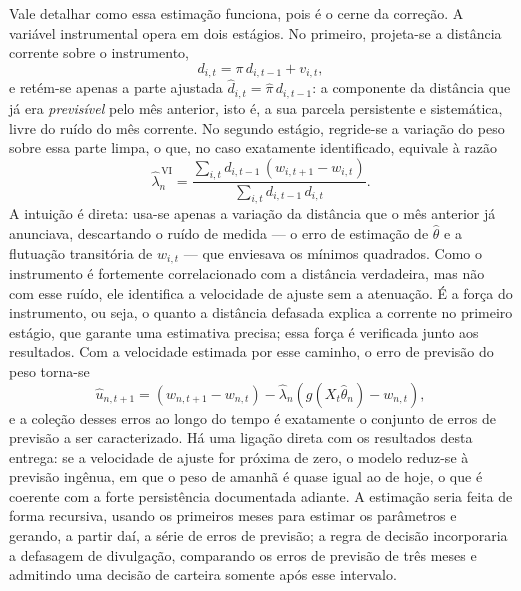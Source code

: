 \documentclass[12pt,a4paper]{article}
\begin{document}
Vale detalhar como essa estimação funciona, pois é o cerne da correção. A variável instrumental
opera em dois estágios. No primeiro, projeta-se a distância corrente sobre o instrumento,
\begin{equation}
d_{i,t} = \pi\,d_{i,t-1} + v_{i,t},
\label{eq:1estagio}
\end{equation}
e retém-se apenas a parte ajustada $\widehat{d}_{i,t}=\widehat{\pi}\,d_{i,t-1}$: a componente da
distância que já era \emph{previsível} pelo mês anterior, isto é, a sua parcela persistente e
sistemática, livre do ruído do mês corrente. No segundo estágio, regride-se a variação do peso
sobre essa parte limpa, o que, no caso exatamente identificado, equivale à razão
\begin{equation}
\widehat{\lambda}^{\,\text{VI}}_n =
\frac{\sum_{i,t} d_{i,t-1}\,(w_{i,t+1}-w_{i,t})}{\sum_{i,t} d_{i,t-1}\,d_{i,t}}.
\label{eq:lambdaiv}
\end{equation}
A intuição é direta: usa-se apenas a variação da distância que o mês anterior já anunciava,
descartando o ruído de medida --- o erro de estimação de $\widehat{\theta}$ e a flutuação
transitória de $w_{i,t}$ --- que enviesava os mínimos quadrados. Como o instrumento é fortemente
correlacionado com a distância verdadeira, mas não com esse ruído, ele identifica a velocidade de
ajuste sem a atenuação. É a força do instrumento, ou seja, o quanto a distância defasada explica a
corrente no primeiro estágio, que garante uma estimativa precisa; essa força é verificada junto aos
resultados. Com a velocidade estimada por esse caminho, o erro de previsão do peso
torna-se
\begin{equation}
\widehat{u}_{n,t+1} = (w_{n,t+1}-w_{n,t}) - \widehat{\lambda}_n\!\left(g(X_t\widehat{\theta}_n)-w_{n,t}\right),
\label{eq:u}
\end{equation}
e a coleção desses erros ao longo do tempo é exatamente o conjunto de erros de previsão a ser
caracterizado. Há uma ligação direta com os resultados desta entrega: se a velocidade de ajuste
for próxima de zero, o modelo reduz-se à previsão ingênua, em que o peso de amanhã é quase igual
ao de hoje, o que é coerente com a forte persistência documentada adiante. A estimação seria
feita de forma recursiva, usando os primeiros meses para estimar os parâmetros e gerando, a
partir daí, a série de erros de previsão; a regra de decisão incorporaria a defasagem de
divulgação, comparando os erros de previsão de três meses e admitindo uma decisão de carteira
somente após esse intervalo.
\end{document}
